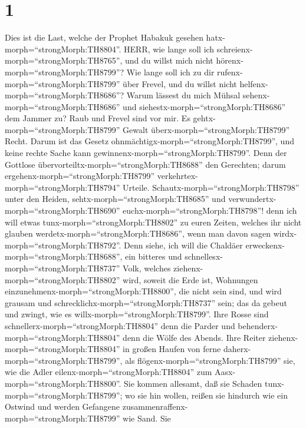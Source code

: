 \hypertarget{section}{%
\section{1}\label{section}}

 Dies ist die Last, welche der Prophet Habakuk gesehen
hatx-morph=``strongMorph:TH8804''.  HERR, wie lange soll ich
schreienx-morph=``strongMorph:TH8765'', und du willst mich nicht
hörenx-morph=``strongMorph:TH8799''? Wie lange soll ich zu dir
rufenx-morph=``strongMorph:TH8799'' über Frevel, und du willst nicht
helfenx-morph=``strongMorph:TH8686''?  Warum lässest du mich
Mühsal sehenx-morph=``strongMorph:TH8686'' und
siehestx-morph=``strongMorph:TH8686'' dem Jammer zu? Raub und Frevel
sind vor mir. Es gehtx-morph=``strongMorph:TH8799'' Gewalt
überx-morph=``strongMorph:TH8799'' Recht.  Darum ist das
Gesetz ohnmächtigx-morph=``strongMorph:TH8799'', und keine rechte Sache
kann gewinnenx-morph=``strongMorph:TH8799''. Denn der Gottlose
übervorteiltx-morph=``strongMorph:TH8688'' den Gerechten; darum
ergehenx-morph=``strongMorph:TH8799''
verkehrtex-morph=``strongMorph:TH8794'' Urteile. 
Schautx-morph=``strongMorph:TH8798'' unter den Heiden,
sehtx-morph=``strongMorph:TH8685'' und
verwundertx-morph=``strongMorph:TH8690''
euchx-morph=``strongMorph:TH8798''! denn ich will etwas
tunx-morph=``strongMorph:TH8802'' zu euren Zeiten, welches ihr nicht
glauben werdetx-morph=``strongMorph:TH8686'', wenn man davon sagen
wirdx-morph=``strongMorph:TH8792''.  Denn siehe, ich will
die Chaldäer erweckenx-morph=``strongMorph:TH8688'', ein bitteres und
schnellesx-morph=``strongMorph:TH8737'' Volk, welches
ziehenx-morph=``strongMorph:TH8802'' wird, soweit die Erde ist,
Wohnungen einzunehmenx-morph=``strongMorph:TH8800'', die nicht sein
sind,  und wird grausam und
schrecklichx-morph=``strongMorph:TH8737'' sein; das da gebeut und
zwingt, wie es willx-morph=``strongMorph:TH8799''.  Ihre
Rosse sind schnellerx-morph=``strongMorph:TH8804'' denn die Parder und
behenderx-morph=``strongMorph:TH8804'' denn die Wölfe des Abends. Ihre
Reiter ziehenx-morph=``strongMorph:TH8804'' in großen Haufen von ferne
daherx-morph=``strongMorph:TH8799'', als
flögenx-morph=``strongMorph:TH8799'' sie, wie die Adler
eilenx-morph=``strongMorph:TH8804'' zum
Aasx-morph=``strongMorph:TH8800''.  Sie kommen allesamt, daß
sie Schaden tunx-morph=``strongMorph:TH8799''; wo sie hin wollen, reißen
sie hindurch wie ein Ostwind und werden Gefangene
zusammenraffenx-morph=``strongMorph:TH8799'' wie Sand.  Sie
